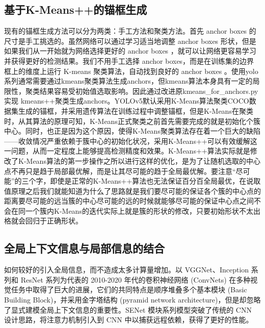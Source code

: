\subsection{基于K-Means++的锚框生成}
现有的锚框生成方法可以分为两类：手工方法和聚类方法。首先 anchor boxes 的尺寸是手工挑选的。虽然网络可以通过学习适当地调整 anchor boxes 形状，但是如果我们从一开始就为网络选择更好的 anchor boxes ，就可以让网络更容易学习并获得更好的检测结果。我们不用手工选择 anchor boxes，而是在训练集的边界框上的维度上运行 K-means 聚类算法，自动找到良好的 anchor boxes 。使用yolo系列通常需要通过kmeans聚类算法生成anchors，但kmeans算法本身具有一定的局限性，聚类结果容易受初始值选取影响。因此通过改进原kmeans\_for\_anchors.py实现 kmeans++聚类生成anchors。YOLOv5默认采用K-Means算法聚类COCO数据集生成的锚框，并采用遗传算法在训练过程中调整锚框，但是K-Means在聚类时，从其算法的原理可知，K-Means正式聚类之前首先需要完成的就是初始化个簇中心。同时，也正是因为这个原因，使得K-Means聚类算法存在着一个巨大的缺陷——收敛情况严重依赖于簇中心的初始化状况，采用K-Means++可以有效缓解这一问题，从而一定程度上能够提高检测精度和效果。K-Means++算法实际就是修改了K-Means算法的第一步操作之所以进行这样的优化，是为了让随机选取的中心点不再只是趋于局部最优解，而是让其尽可能的趋于全局最优解。要注意“尽可能”的三个字，即使是正常的K-Means++算法也无法保证百分百全局最优，在说取值原理之后我们就能知道为什么了思路就是我们要尽可能的保证各个簇的中心点的距离要尽可能的远当簇的中心尽可能的远的时候就能够尽可能的保证中心点之间不会在同一个簇内K-Means的迭代实际上就是簇的形状的修改，只要初始形状不太出格就会回归于正确形状。

\subsection{全局上下文信息与局部信息的结合}
如何较好的引入全局信息，而不造成太多计算量增加。以 VGGNet、Inception 系列和 ResNet 系列为代表的 2010-2020 年代的卷积神经网络 (ConvNets) 在多种视觉任务中取得了巨大的进展，它们的共同特点是顺序堆叠多个基本模块 (Basic Building Block)，并采用金字塔结构 (pyramid network architecture)，但是却忽略了显式建模全局上下文信息的重要性。SENet 模块系列模型突破了传统的 CNN 设计思路，将注意力机制引入到 CNN 中以捕获远程依赖，获得了更好的性能。

